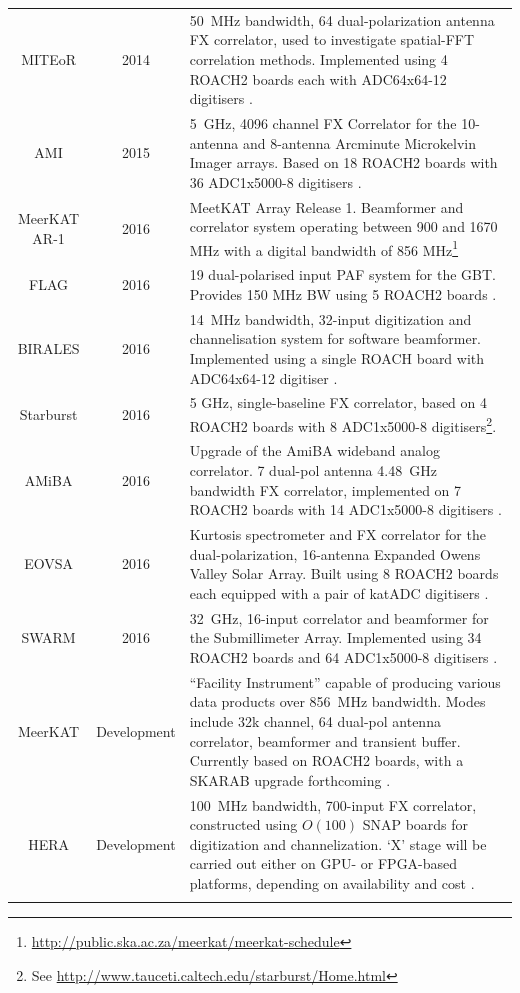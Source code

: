 \documentclass{ws-jai}
\begin{document}
\begin{longtable}{ccp{10cm}}
  MITEoR           & 2014 & 50~MHz bandwidth, 64 dual-polarization antenna FX correlator, used to investigate spatial-FFT correlation methods. Implemented using 4 ROACH2 boards each with ADC64x64-12 digitisers \citep{2014MNRAS.445.1084Z}. \\
  AMI              & 2015 & 5~GHz, 4096 channel FX Correlator for the 10-antenna and 8-antenna Arcminute Microkelvin Imager arrays. Based on 18 ROACH2 boards with 36 ADC1x5000-8 digitisers \citep{Zwart21122008, ami-digital}. \\
  MeerKAT AR-1     & 2016 & MeetKAT Array Release 1. Beamformer and correlator system operating between 900 and 1670 MHz with a digital bandwidth of 856 MHz\footnote{\url{http://public.ska.ac.za/meerkat/meerkat-schedule}} \\
  FLAG             & 2016 & 19 dual-polarised input PAF system for the GBT. Provides 150 MHz BW using 5 ROACH2 boards \citep{gb_flag, gb_beamformer}. \\
  BIRALES          & 2016 & 14~MHz bandwidth, 32-input digitization and channelisation system for software beamformer. Implemented using a single ROACH board with ADC64x64-12 digitiser \citep{7180719}. \\
  Starburst        & 2016 & 5 GHz, single-baseline FX correlator, based on 4 ROACH2 boards with 8 ADC1x5000-8 digitisers\footnote{See \url{http://www.tauceti.caltech.edu/starburst/Home.html}}. \\
  AMiBA            & 2016 & Upgrade of the AmiBA wideband analog correlator. 7 dual-pol antenna 4.48~GHz bandwidth FX correlator, implemented on 7 ROACH2 boards with 14 ADC1x5000-8 digitisers \citep{amiba-adc, amiba-interim}. \\
  EOVSA            & 2016 & Kurtosis spectrometer and FX correlator for the dual-polarization, 16-antenna Expanded Owens Valley Solar Array. Built using 8 ROACH2 boards each equipped with a pair of katADC digitisers \citep{eovsa}.\\
  SWARM            & 2016 & 32~GHz, 16-input correlator and beamformer for the Submillimeter Array. Implemented using 34 ROACH2 boards and 64 ADC1x5000-8 digitisers \citep{swarm}. \\
  MeerKAT          & Development & ``Facility Instrument'' capable of producing various data products over 856~MHz bandwidth. Modes include 32k channel, 64 dual-pol antenna correlator, beamformer and transient buffer. Currently based on ROACH2 boards, with a SKARAB upgrade forthcoming \citep{meerkat-req}. \\
  HERA             & Development & 100~MHz bandwidth, 700-input FX correlator, constructed using $O(100)$ SNAP boards for digitization and channelization. `X' stage will be carried out either on GPU- or FPGA-based platforms, depending on availability and cost \citep{2016arXiv160607473D}. \\
  \label{table:casper-instruments-correlators}

\end{longtable}
\end{document}

